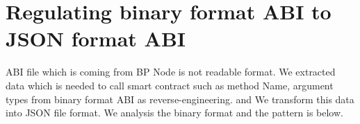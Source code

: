 \section{Regulating binary format ABI to JSON format ABI}
ABI file which is coming from BP Node is not readable format. 
We extracted data which is needed to call smart contract such as method Name, argument types from binary format ABI as reverse-engineering. and We transform this data into JSON file format. 
We analysis the binary format and the pattern is below.

